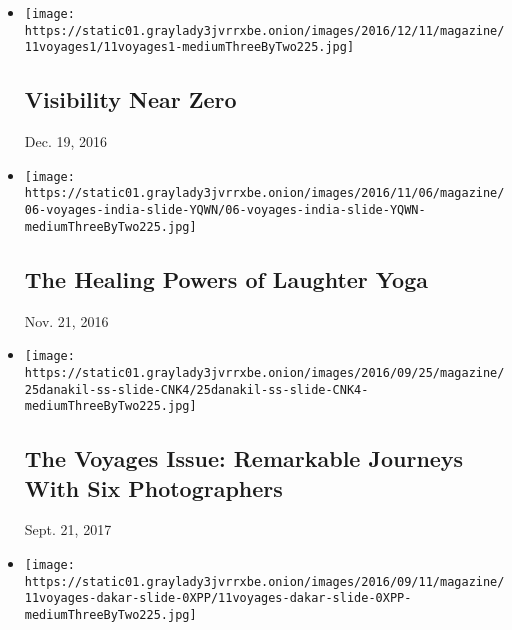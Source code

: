 \begin{itemize}
\item
  \href{https://www.nytimes3xbfgragh.onion/interactive/2016/12/09/magazine/newfoundland-canada-fog-photography.html}{}

  \texttt{[image: https://static01.graylady3jvrrxbe.onion/images/2016/12/11/magazine/11voyages1/11voyages1-mediumThreeByTwo225.jpg]}

  \hypertarget{visibility-near-zero}{%
  \subsection{Visibility Near Zero}\label{visibility-near-zero}}

  Dec. 19, 2016
\item
  \href{https://www.nytimes3xbfgragh.onion/interactive/2016/11/06/magazine/voyages-laughter-yoga-bangalore.html}{}

  \texttt{[image: https://static01.graylady3jvrrxbe.onion/images/2016/11/06/magazine/06-voyages-india-slide-YQWN/06-voyages-india-slide-YQWN-mediumThreeByTwo225.jpg]}

  \hypertarget{the-healing-powers-of-laughter-yoga}{%
  \subsection{The Healing Powers of Laughter
  Yoga}\label{the-healing-powers-of-laughter-yoga}}

  Nov. 21, 2016
\item
  \href{https://www.nytimes3xbfgragh.onion/interactive/2016/09/25/magazine/the-voyages-issue.html}{}

  \texttt{[image: https://static01.graylady3jvrrxbe.onion/images/2016/09/25/magazine/25danakil-ss-slide-CNK4/25danakil-ss-slide-CNK4-mediumThreeByTwo225.jpg]}

  \hypertarget{the-voyages-issue-remarkable-journeys-with-six-photographers}{%
  \subsection{The Voyages Issue: Remarkable Journeys With Six
  Photographers}\label{the-voyages-issue-remarkable-journeys-with-six-photographers}}

  Sept. 21, 2017
\item
  \href{https://www.nytimes3xbfgragh.onion/interactive/2016/09/11/magazine/voyages-dakar-surfing.html}{}

  \texttt{[image: https://static01.graylady3jvrrxbe.onion/images/2016/09/11/magazine/11voyages-dakar-slide-0XPP/11voyages-dakar-slide-0XPP-mediumThreeByTwo225.jpg]}


\end{itemize}

